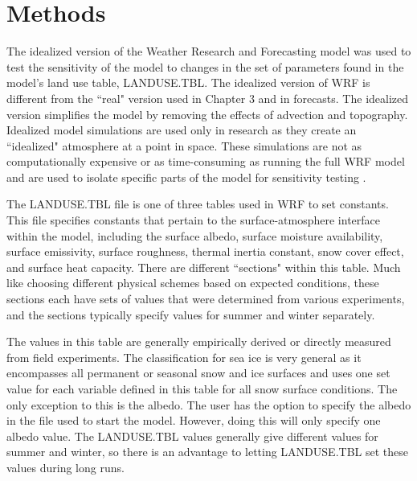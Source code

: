 \section{Methods}
The idealized version of the Weather Research and Forecasting model \citep{skamarock:2019} was used to test the sensitivity of the model to changes in the set of parameters found in the model's land use table, LANDUSE.TBL. The idealized version of WRF is different from the ``real" version used in Chapter 3 and in forecasts. The idealized version simplifies the model by removing the effects of advection and topography. Idealized model simulations are used only in research as they create an ``idealized" atmosphere at a point in space. These simulations are not as computationally expensive or as time-consuming as running the full WRF model and are used to isolate specific parts of the model for sensitivity testing \citep{arw:2019}. 

The LANDUSE.TBL file is one of three tables used in WRF to set constants. This file specifies constants that pertain to the surface-atmosphere interface within the model, including the surface albedo, surface moisture availability, surface emissivity, surface roughness, thermal inertia constant, snow cover effect, and surface heat capacity. There are different ``sections" within this table. Much like choosing different physical schemes based on expected conditions, these sections each have sets of values that were determined from various experiments, and the sections typically specify values for summer and winter separately. 

The values in this table are generally empirically derived or directly measured from field experiments. The classification for sea ice is very general as it encompasses all permanent or seasonal snow and ice surfaces and uses one set value for each variable defined in this table for all snow surface conditions. The only exception to this is the albedo. The user has the option to specify the albedo in the file used to start the model. However, doing this will only specify one albedo value. The LANDUSE.TBL values generally give different values for summer and winter, so there is an advantage to letting LANDUSE.TBL set these values during long runs. 

